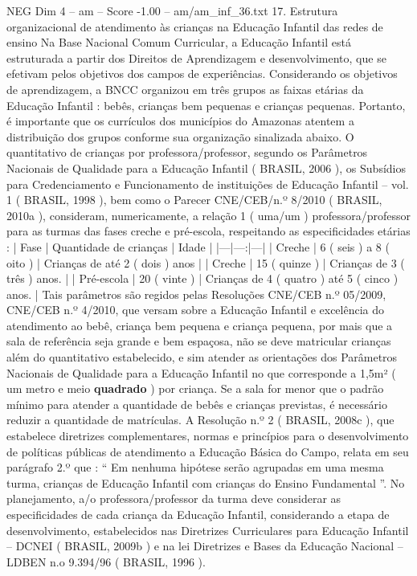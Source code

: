 \begin{textsample}{NEG Dim 4 – am – Score -1.00 – am/am\_inf\_36.txt}  \label{ex:f4_neg_188}
17.
Estrutura organizacional de atendimento às crianças na Educação Infantil das redes de ensino Na Base Nacional Comum Curricular, a Educação Infantil está estruturada a partir dos Direitos de Aprendizagem e desenvolvimento, que se efetivam pelos objetivos dos campos de experiências.
Considerando os objetivos de aprendizagem, a BNCC organizou em três grupos as faixas etárias da Educação Infantil : bebês, crianças bem pequenas e crianças pequenas.
Portanto, é importante que os currículos dos municípios do Amazonas atentem a distribuição dos grupos conforme sua organização sinalizada abaixo.
O quantitativo de crianças por professora/professor, segundo os Parâmetros Nacionais de Qualidade para a Educação Infantil ( BRASIL, 2006 ), os Subsídios para Credenciamento e Funcionamento de instituições de Educação Infantil – vol. 1 ( BRASIL, 1998 ), bem como o Parecer CNE/CEB/n.º 8/2010 ( BRASIL, 2010a ), consideram, numericamente, a relação 1 ( uma/um ) professora/professor para as turmas das fases creche e pré-escola, respeitando as especificidades etárias : | Fase | Quantidade de crianças | Idade | |---|---:|---| | Creche | 6 ( seis ) a 8 ( oito ) | Crianças de até 2 ( dois ) anos | | Creche | 15 ( quinze ) | Crianças de 3 ( três ) anos. | | Pré-escola | 20 ( vinte ) | Crianças de 4 ( quatro ) até 5 ( cinco ) anos. | Tais parâmetros são regidos pelas Resoluções CNE/CEB n.º 05/2009, CNE/CEB n.º 4/2010, que versam sobre a Educação Infantil e excelência do atendimento ao bebê, criança bem pequena e criança pequena, por mais que a sala de referência seja grande e bem espaçosa, não se deve matricular crianças além do quantitativo estabelecido, e sim atender as orientações dos Parâmetros Nacionais de Qualidade para a Educação Infantil no que corresponde a 1,5m² ( um metro e meio \textbf{quadrado} ) por criança.
Se a sala for menor que o padrão mínimo para atender a quantidade de bebês e crianças previstas, é necessário reduzir a quantidade de matrículas.
A Resolução n.º 2 ( BRASIL, 2008c ), que estabelece diretrizes complementares, normas e princípios para o desenvolvimento de políticas públicas de atendimento a Educação Básica do Campo, relata em seu parágrafo 2.º que : “ Em nenhuma hipótese serão agrupadas em uma mesma turma, crianças de Educação Infantil com crianças do Ensino Fundamental ”.
No planejamento, a/o professora/professor da turma deve considerar as especificidades de cada criança da Educação Infantil, considerando a etapa de desenvolvimento, estabelecidos nas Diretrizes Curriculares para Educação Infantil – DCNEI ( BRASIL, 2009b ) e na lei Diretrizes e Bases da Educação Nacional – LDBEN n.o 9.394/96 ( BRASIL, 1996 ).

\end{textsample}
